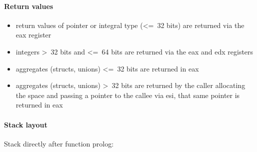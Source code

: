 \paragraph{Return values}

\begin{itemize}
\item return values of pointer or integral type (\textless=\ 32 bits) are returned via the eax register
\item integers \textgreater\ 32 bits and \textless=\ 64 bits are returned via the eax and edx registers
\item aggregates (structs, unions) \textless=\ 32 bits are returned in eax
\item aggregates (structs, unions) \textgreater\ 32 bits are returned by the caller allocating the space and
passing a pointer to the callee via esi, that same pointer is returned in eax
\end{itemize}


\paragraph{Stack layout}

Stack directly after function prolog:\\

